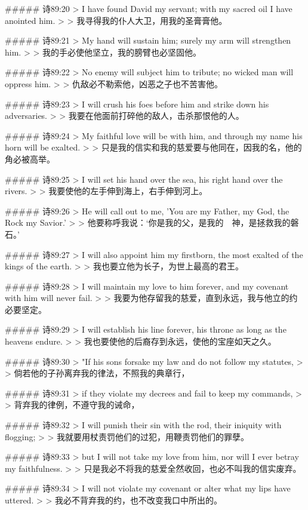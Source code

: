 ##### 诗89:20
> I have found David my servant; with my sacred oil I have anointed him.
>
> 我寻得我的仆人大卫，用我的圣膏膏他。


##### 诗89:21
> My hand will sustain him; surely my arm will strengthen him.
>
> 我的手必使他坚立，我的膀臂也必坚固他。


##### 诗89:22
> No enemy will subject him to tribute; no wicked man will oppress him.
>
> 仇敌必不勒索他，凶恶之子也不苦害他。


##### 诗89:23
> I will crush his foes before him and strike down his adversaries.
>
> 我要在他面前打碎他的敌人，击杀那恨他的人。


##### 诗89:24
> My faithful love will be with him, and through my name his horn will be exalted.
>
> 只是我的信实和我的慈爱要与他同在，因我的名，他的角必被高举。


##### 诗89:25
> I will set his hand over the sea, his right hand over the rivers.
>
> 我要使他的左手伸到海上，右手伸到河上。


##### 诗89:26
> He will call out to me, 'You are my Father, my God, the Rock my Savior.'
>
> 他要称呼我说：‘你是我的父，是我的　神，是拯救我的磐石。’


##### 诗89:27
> I will also appoint him my firstborn, the most exalted of the kings of the earth.
>
> 我也要立他为长子，为世上最高的君王。


##### 诗89:28
> I will maintain my love to him forever, and my covenant with him will never fail.
>
> 我要为他存留我的慈爱，直到永远，我与他立的约必要坚定。


##### 诗89:29
> I will establish his line forever, his throne as long as the heavens endure.
>
> 我也要使他的后裔存到永远，使他的宝座如天之久。


##### 诗89:30
> "If his sons forsake my law and do not follow my statutes,
>
> 倘若他的子孙离弃我的律法，不照我的典章行，


##### 诗89:31
> if they violate my decrees and fail to keep my commands,
>
> 背弃我的律例，不遵守我的诫命，


##### 诗89:32
> I will punish their sin with the rod, their iniquity with flogging;
>
> 我就要用杖责罚他们的过犯，用鞭责罚他们的罪孽。


##### 诗89:33
> but I will not take my love from him, nor will I ever betray my faithfulness.
>
> 只是我必不将我的慈爱全然收回，也必不叫我的信实废弃。


##### 诗89:34
> I will not violate my covenant or alter what my lips have uttered.
>
> 我必不背弃我的约，也不改变我口中所出的。


